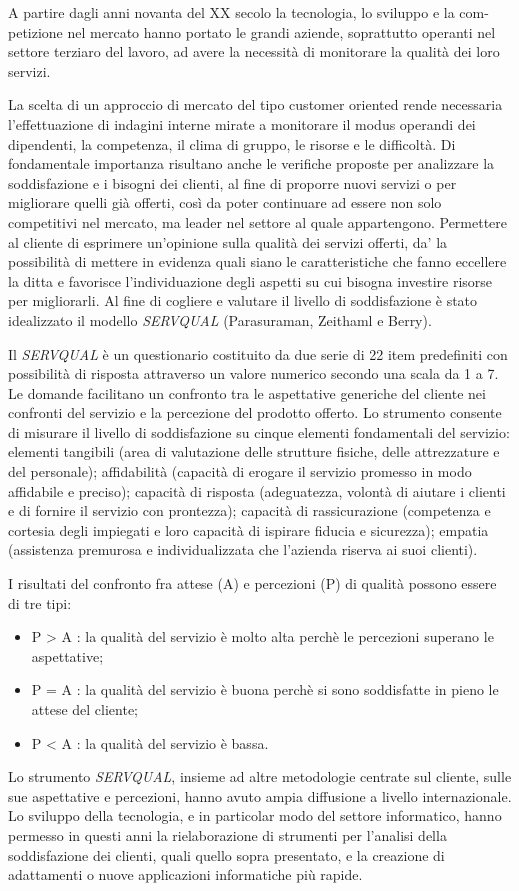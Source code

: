 A partire dagli anni novanta del XX secolo la tecnologia, lo sviluppo e la com-
petizione nel mercato hanno portato le grandi aziende, soprattutto operanti nel
settore terziaro del lavoro, ad avere la necessità di monitorare la qualità dei
loro servizi.

La scelta di un approccio di mercato del tipo customer oriented rende
necessaria l'effettuazione di indagini interne mirate a monitorare il modus
operandi dei dipendenti, la competenza, il clima di gruppo, le risorse e le
difficoltà. Di fondamentale importanza risultano anche le verifiche proposte per
analizzare la soddisfazione e i bisogni dei clienti, al fine di proporre nuovi
servizi o per migliorare quelli già offerti, così da poter continuare ad essere
non solo competitivi nel mercato, ma leader nel settore al quale appartengono.
Permettere al cliente di esprimere un'opinione sulla qualità dei servizi
offerti, da' la possibilità di mettere in evidenza quali siano le
caratteristiche che fanno eccellere la ditta e favorisce l'individuazione degli
aspetti su cui bisogna investire risorse per migliorarli.
Al fine di cogliere e valutare il livello di soddisfazione è stato idealizzato
il modello \emph{SERVQUAL} (Parasuraman, Zeithaml e Berry). 

Il \emph{SERVQUAL} è un
questionario costituito da due serie di 22 item predefiniti con possibilità di
risposta attraverso un valore numerico secondo una scala da 1 a 7. Le domande
facilitano un confronto tra le aspettative generiche del cliente nei confronti
del servizio e la percezione del prodotto offerto.
Lo strumento consente di misurare il livello di soddisfazione su cinque elementi
fondamentali del servizio: elementi tangibili  (area di valutazione delle
strutture fisiche, delle attrezzature e del personale); affidabilità (capacità
di erogare il servizio promesso in modo affidabile e preciso); capacità di
risposta (adeguatezza, volontà di aiutare i clienti e di fornire il servizio con
prontezza); capacità di rassicurazione (competenza e cortesia degli impiegati e
loro capacità di ispirare fiducia e sicurezza); empatia (assistenza premurosa e
individualizzata che l’azienda riserva ai suoi clienti).

I risultati del confronto fra attese (A) e percezioni (P) di qualità possono
essere di tre tipi:
\begin{itemize}
  \item P > A : la qualità del servizio è molto alta perchè le percezioni
  superano le aspettative;
  \item P = A : la qualità del servizio è buona perchè si sono soddisfatte in
  pieno le attese del cliente;
  \item P < A : la qualità del servizio è bassa. 
\end{itemize}
Lo strumento \emph{SERVQUAL}, insieme ad altre metodologie centrate sul cliente,
sulle sue aspettative e percezioni, hanno avuto ampia diffusione a livello
internazionale. Lo sviluppo della tecnologia, e in particolar modo del settore
informatico, hanno permesso in questi anni la rielaborazione di strumenti per
l’analisi della soddisfazione dei clienti, quali quello sopra presentato, e la
creazione di adattamenti o nuove applicazioni informatiche più rapide.
\\

